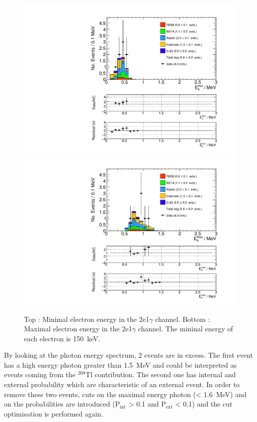\documentclass[main.tex]{subfiles}
\begin{document}
\begin{figure} [h!]
\begin{center}
\includegraphics[scale=0.35]{pictures/FinalResults/bb0nu2/150/Eemin_bb0nu2NS.pdf}
\includegraphics[scale=0.35]{pictures/FinalResults/bb0nu2/150/Eemax_bb0nu2NS.pdf}
\end{center}
\caption{Top : Minimal electron energy in the 2e1$\gamma$ channel. Bottom : Maximal electron energy in the 2e1$\gamma$ channel. The mininal energy of each electron is 150~keV.}
\label{plot:EeminAndEemax250bb0nu2}
\end{figure}


\NI By looking at the photon energy spectrum, 2 events are in excess. The first event has a high energy photon greater than 1.5~MeV and could be interpreted as events coming from the $^{\text{208}}$Tl contribution. The second one has internal and external probability which are characteristic of an external event. In order to remove these two events, cuts on the maximal energy photon (< 1.6~MeV) and on the probabilities are introduced (P$_\text{int}$ > 0.1 and P$_\text{ext}$ < 0.1) and the cut optimisation is performed again.
\end{document}
